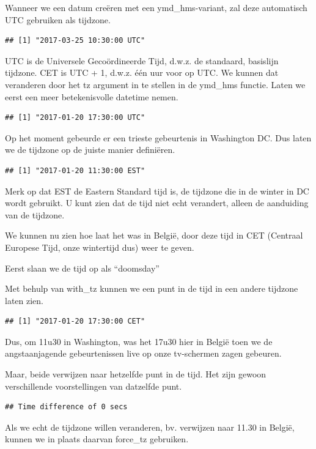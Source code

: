 \documentclass[]{tufte-book}
\begin{document}
Wanneer we een datum creëren met een ymd\_hms-variant, zal deze automatisch UTC gebruiken als tijdzone.

\begin{verbatim}
## [1] "2017-03-25 10:30:00 UTC"
\end{verbatim}

UTC is de Universele Gecoördineerde Tijd, d.w.z. de standaard, basislijn tijdzone. CET is UTC + 1, d.w.z. één uur voor op UTC. We kunnen dat veranderen door het tz argument in te stellen in de ymd\_hms functie. Laten we eerst een meer betekenisvolle datetime nemen.

\begin{verbatim}
## [1] "2017-01-20 17:30:00 UTC"
\end{verbatim}

Op het moment gebeurde er een trieste gebeurtenis in Washington DC. Dus laten we de tijdzone op de juiste manier definiëren.

\begin{verbatim}
## [1] "2017-01-20 11:30:00 EST"
\end{verbatim}

Merk op dat EST de Eastern Standard tijd is, de tijdzone die in de winter in DC wordt gebruikt. U kunt zien dat de tijd niet echt verandert, alleen de aanduiding van de tijdzone.

We kunnen nu zien hoe laat het was in België, door deze tijd in CET (Centraal Europese Tijd, onze wintertijd dus) weer te geven.

Eerst slaan we de tijd op als ``doomsday''

Met behulp van with\_tz kunnen we een punt in de tijd in een andere tijdzone laten zien.

\begin{verbatim}
## [1] "2017-01-20 17:30:00 CET"
\end{verbatim}

Dus, om 11u30 in Washington, was het 17u30 hier in België toen we de angstaanjagende gebeurtenissen live op onze tv-schermen zagen gebeuren.

Maar, beide verwijzen naar hetzelfde punt in de tijd. Het zijn gewoon verschillende voorstellingen van datzelfde punt.

\begin{verbatim}
## Time difference of 0 secs
\end{verbatim}

Als we echt de tijdzone willen veranderen, bv. verwijzen naar 11.30 in België, kunnen we in plaats daarvan force\_tz gebruiken.
\end{document}
